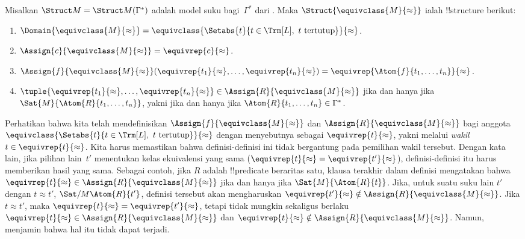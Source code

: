 \documentclass[../../../include/open-logic-section]{subfiles}
\begin{document}
\begin{defn}
Misalkan $\Struct M = \Struct M(\Gamma^*)$ adalah model suku
bagi~$\Gamma^*$ dari . Maka
$\Struct{\equivclass{M}{\approx}}$ ialah !!{structure} berikut:
\begin{enumerate}
\item $\Domain{\equivclass{M}{\approx}} =
  \equivclass{\Setabs{t}{t \in \Trm[L],\ t \text{ tertutup}}}{\approx}$.
\item $\Assign{c}{\equivclass{M}{\approx}} = \equivrep{c}{\approx}$.
\item $\Assign{f}{\equivclass{M}{\approx}}(\equivrep{t_1}{\approx}, \dots,
  \equivrep{t_n}{\approx}) = \equivrep{\Atom{f}{t_1,\dots, t_n}}{\approx}$.
\item $\tuple{\equivrep{t_1}{\approx}, \dots, \equivrep{t_n}{\approx}} \in
  \Assign{R}{\equivclass{M}{\approx}}$ jika dan hanya jika
  $\Sat{M}{\Atom{R}{t_1,\dots, t_n}}$, yakni jika dan hanya jika
  $\Atom{R}{t_1,\dots, t_n} \in \Gamma^*$.
\end{enumerate}
\end{defn}

\begin{explain}
Perhatikan bahwa kita telah mendefinisikan
$\Assign{f}{\equivclass{M}{\approx}}$ dan
$\Assign{R}{\equivclass{M}{\approx}}$ bagi anggota
$\equivclass{\Setabs{t}{t \in \Trm[L],\ t \text{ tertutup}}}{\approx}$
dengan menyebutnya sebagai
$\equivrep{t}{\approx}$, yakni melalui \emph{wakil}~$t \in
\equivrep{t}{\approx}$. Kita harus memastikan bahwa definisi-definisi
ini tidak bergantung pada pemilihan wakil tersebut. Dengan kata lain,
jika pilihan lain~$t'$ menentukan kelas ekuivalensi yang sama
($\equivrep{t}{\approx} = \equivrep{t'}{\approx}$), definisi-definisi itu
harus memberikan hasil yang sama. Sebagai contoh, jika $R$ adalah
!!{predicate} beraritas satu, klausa terakhir dalam definisi mengatakan
bahwa $\equivrep{t}{\approx} \in \Assign{R}{\equivclass{M}{\approx}}$
jika dan hanya jika $\Sat{M}{\Atom{R}{t}}$. Jika, untuk suatu suku lain
$t'$ dengan $t \approx t'$, $\Sat/{M}{\Atom{R}{t'}}$, definisi tersebut
akan mengharuskan $\equivrep{t'}{\approx} \notin
\Assign{R}{\equivclass{M}{\approx}}$. Jika $t \approx t'$, maka
$\equivrep{t}{\approx} = \equivrep{t'}{\approx}$, tetapi tidak mungkin
sekaligus berlaku $\equivrep{t}{\approx} \in
\Assign{R}{\equivclass{M}{\approx}}$ dan $\equivrep{t}{\approx} \notin
\Assign{R}{\equivclass{M}{\approx}}$. Namun,
 menjamin bahwa hal itu tidak dapat terjadi.
\end{explain}
\end{document}
